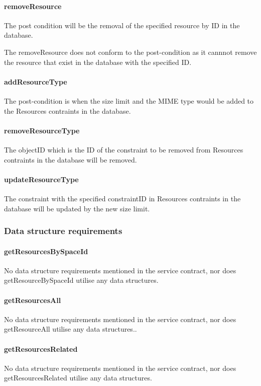 \documentclass[a4paper]{article}
\begin{document}
\paragraph{removeResource}
The post condition will be the removal of the specified resource by ID in the database.

The removeResource does not conform to the post-condition as it cannnot remove the resource that exist in the database with the specified ID.

\paragraph{addResourceType}
The post-condition is when the size limit and the MIME type would be added to the Resources contraints in the database.

\paragraph{removeResourceType}
The objectID which is the ID of the constraint to be removed from Resources contraints in the database will be removed.

\paragraph{updateResourceType}
The constraint with the specified constraintID in Resources contraints in the database will be updated by the new size limit.
\subsubsection {Data structure requirements}

\paragraph{getResourcesBySpaceId}
No data structure requirements mentioned in the service contract, nor does getResourceBySpaceId utilise any data structures.

\paragraph{getResourcesAll}
No data structure requirements mentioned in the service contract, nor does getResourceAll utilise any data structures..

\paragraph{getResourcesRelated}
No data structure requirements mentioned in the service contract, nor does getResourcesRelated utilise any data structures.
\end{document}
